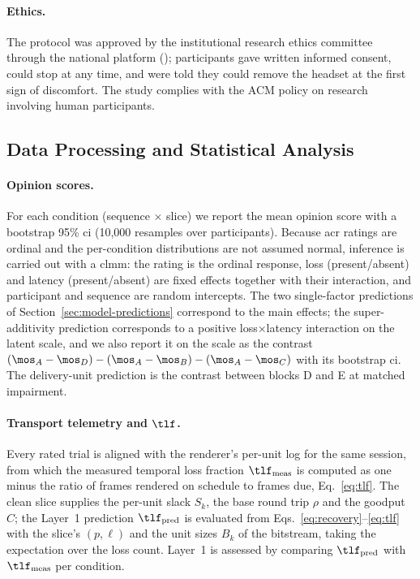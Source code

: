 \paragraph{Ethics.}
The protocol was approved by the institutional research ethics
committee through the national platform
(); participants gave written informed consent, could
stop at any time, and were told they could remove the headset at the
first sign of discomfort. The study complies with the ACM policy on
research involving human participants.

\subsection{Data Processing and Statistical Analysis}
\label{sec:design-analysis}

\paragraph{Opinion scores.}
For each condition (sequence $\times$ slice) we report the mean
opinion score with a bootstrap 95\% \gls{ci} (10,000 resamples over
participants). Because \gls{acr} ratings are ordinal and the
per-condition distributions are not assumed normal, inference is
carried out with a \gls{clmm}: the rating is the ordinal response,
loss (present/absent) and latency (present/absent) are fixed effects
together with their interaction, and participant and sequence are
random intercepts. The two single-factor predictions of
Section~\ref{sec:model-predictions} correspond to the main effects;
the super-additivity prediction corresponds to a positive
loss$\times$latency interaction on the latent scale, and we also
report it on the \mos scale as the contrast
$(\mos_A - \mos_D) - (\mos_A - \mos_B) - (\mos_A - \mos_C)$ with its
bootstrap \gls{ci}. The delivery-unit prediction is the contrast
between blocks D and E at matched impairment.

\paragraph{Transport telemetry and $\tlf$.}
Every rated trial is aligned with the renderer's per-unit log for the
same session, from which the measured temporal loss fraction
$\tlf_{\mathrm{meas}}$ is computed as one minus the ratio of frames
rendered on schedule to frames due, Eq.~\eqref{eq:tlf}. The clean
slice supplies the per-unit slack $S_k$, the base round trip $\rho$
and the goodput $C$; the Layer~1 prediction $\tlf_{\mathrm{pred}}$ is
evaluated from Eqs.~\eqref{eq:recovery}--\eqref{eq:tlf} with the
slice's $(p, \ell)$ and the unit sizes $B_k$ of the bitstream, taking
the expectation over the loss count. Layer~1 is assessed by comparing
$\tlf_{\mathrm{pred}}$ with $\tlf_{\mathrm{meas}}$ per condition.

